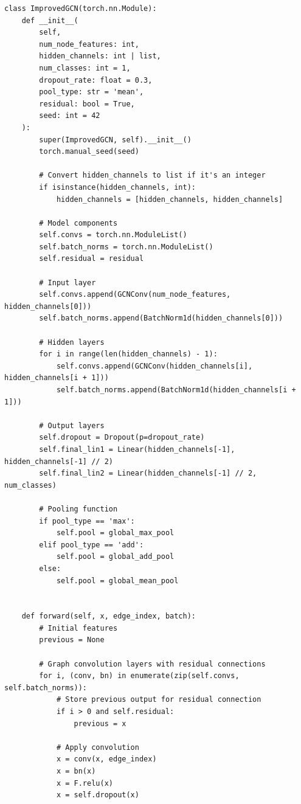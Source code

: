 \begin{lstlisting}[caption={Inisialisasi arsitektur dan \textit{forward propagation} model GCN}, label={kode:inisialisasi gcn}]
class ImprovedGCN(torch.nn.Module):
    def __init__(
        self, 
        num_node_features: int,
        hidden_channels: int | list,
        num_classes: int = 1,
        dropout_rate: float = 0.3,
        pool_type: str = 'mean',
        residual: bool = True,
        seed: int = 42
    ):
        super(ImprovedGCN, self).__init__()
        torch.manual_seed(seed)
        
        # Convert hidden_channels to list if it's an integer
        if isinstance(hidden_channels, int):
            hidden_channels = [hidden_channels, hidden_channels]
        
        # Model components
        self.convs = torch.nn.ModuleList()
        self.batch_norms = torch.nn.ModuleList()
        self.residual = residual
        
        # Input layer
        self.convs.append(GCNConv(num_node_features, hidden_channels[0]))
        self.batch_norms.append(BatchNorm1d(hidden_channels[0]))
        
        # Hidden layers
        for i in range(len(hidden_channels) - 1):
            self.convs.append(GCNConv(hidden_channels[i], hidden_channels[i + 1]))
            self.batch_norms.append(BatchNorm1d(hidden_channels[i + 1]))
        
        # Output layers
        self.dropout = Dropout(p=dropout_rate)
        self.final_lin1 = Linear(hidden_channels[-1], hidden_channels[-1] // 2)
        self.final_lin2 = Linear(hidden_channels[-1] // 2, num_classes)
        
        # Pooling function
        if pool_type == 'max':
            self.pool = global_max_pool
        elif pool_type == 'add':
            self.pool = global_add_pool
        else:
            self.pool = global_mean_pool


    def forward(self, x, edge_index, batch):
        # Initial features
        previous = None
        
        # Graph convolution layers with residual connections
        for i, (conv, bn) in enumerate(zip(self.convs, self.batch_norms)):
            # Store previous output for residual connection
            if i > 0 and self.residual:
                previous = x
                
            # Apply convolution
            x = conv(x, edge_index)
            x = bn(x)
            x = F.relu(x)
            x = self.dropout(x)
            

\end{lstlisting}
